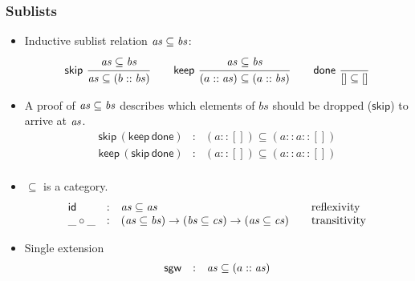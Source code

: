 \documentclass[t,fleqn,usenames,dvipsnames]{beamer}
\begin{document}
\newcommand{\sublist}{\subseteq}
\newcommand{\tskip}{\mathsf{skip}}
\newcommand{\tkeep}{\mathsf{keep}}
\newcommand{\tdone}{\mathsf{done}}
\newcommand{\vbs}{\mathit{bs}}
\newcommand{\vcs}{\mathit{cs}}
\newcommand{\tsgw}{\mathsf{sgw}}


\begin{frame}%
  \frametitle{Sublists}
  \vspace{-3ex}
  \begin{itemize}
  \item Inductive sublist relation $\vas \sublist \vbs$:
\[
  \nru{\tskip}{\vas \sublist \vbs}{\vas \sublist (b :: \vbs)}
\qquad
  \nru{\tkeep}{\vas \sublist \vbs}{(a :: \vas) \sublist (a :: \vbs)}
\qquad
  \nru{\tdone}{}{[] \sublist []}
\]
  \item A proof of $\vas \sublist \vbs$ describes which elements of
    $\vbs$ should be dropped ($\tskip$) to arrive at $\mathit{as}$.
\[
  \begin{array}{lcl}
    \tskip\,(\tkeep\,\tdone) & : & (a :: []) \sublist (a :: a :: []) \\
    \tkeep\,(\tskip\,\tdone) & : & (a :: []) \sublist (a :: a :: []) \\
  \end{array}
\]
  \item $\sublist$ is a category.
\[
  \begin{array}{lcl@{\qquad}l}
    \tid       & : & \vas \sublist \vas & \mbox{reflexivity} \\
    \_\circ\_  & : & (\vas \sublist \vbs) \to (\vbs \sublist \vcs) \to
                     (\vas \sublist \vcs) & \mbox{transitivity} \\
  \end{array}
\]
  \item Single extension
\[
  \begin{array}{lcl}
    \tsgw & : & \vas \sublist (a :: \vas) \\
  \end{array}
\]
  \end{itemize}
\end{frame}

\newcommand{\treindex}{\mathsf{reindex}}
\newcommand{\op}{\mathsf{op}}
\end{document}
